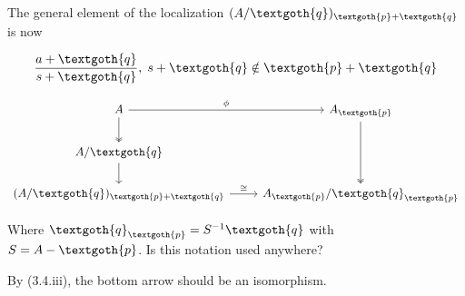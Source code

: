 \documentclass{article}
\begin{document}
The general element of the localization $(A/\textgoth{q})_{\textgoth{p} + \textgoth{q}}$ is now

\[
\frac{a + \textgoth{q}}{s + \textgoth{q}}, \; s + \textgoth{q} \notin \textgoth{p} + \textgoth{q}
\]

\[
  \begin{tikzcd}
     A \arrow[r, "\phi"] \arrow[d, two heads] & A_\textgoth{p} \arrow[dd, , two heads] \\
     A/\textgoth{q} \arrow[d] \\
     (A/\textgoth{q})_{\textgoth{p} + \textgoth{q}} \arrow[r, "\cong"] & A_\textgoth{p}/\textgoth{q}_\textgoth{p} 
  \end{tikzcd}
\]

\noindent
Where $\textgoth{q}_\textgoth{p} = S^{-1}\textgoth{q}$ with $S = A - \textgoth{p}$. Is this notation used anywhere?

By (3.4.iii), the bottom arrow should be an isomorphism. 
\end{document}
